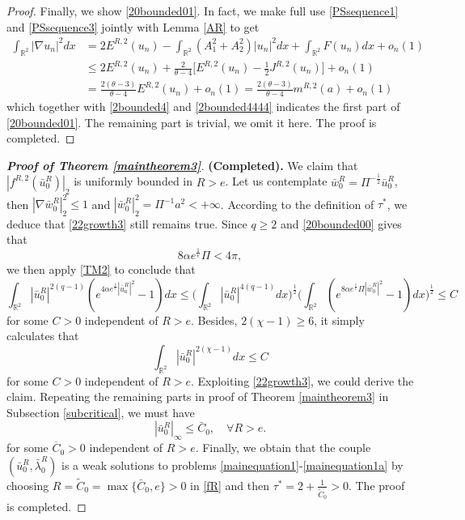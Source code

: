 \documentclass[11pt]{amsart}
\numberwithin{equation}{section}
\theoremstyle{definition}
\newcommand{\R}{\mathbb{R}}
\begin{document}
\begin{proof}
Finally, we show \eqref{20bounded01}. In fact, we make full use \eqref{PSsequence1} and \eqref{PSsequence3} jointly with Lemma \ref{AR}
to get
\begin{align*}
  \int_{\R^2}|\nabla u_n|^2dx &=2E^{R,2}(u_n)-\int_{\R^2}(A_1^2+A_2^2)|u_n|^2dx+\int_{\R^2}F(u_n)dx+o_n(1) \\
    &\leq  2E^{R,2}(u_n)+\frac{2}{\theta-4}\big[E^{R,2}(u_n)-\frac12J^{R,2}(u_n)\big]+o_n(1)\\
 &=  \frac{2(\theta-3)}{\theta-4} E^{R,2}(u_n) +o_n(1)
=  \frac{2(\theta-3)}{\theta-4}  m^{R,2}(a)+o_n(1)
\end{align*}
which together with \eqref{2bounded4} and \eqref{2bounded4444} indicates the first part of \eqref{20bounded01}.
The remaining part is trivial, we omit it here. The proof is completed.
\end{proof}



\begin{proof}[\textbf{\emph{Proof of Theorem \ref{maintheorem3}}}]\textbf{(Completed).}
We
 claim that $|f^{R,2}(\bar{u}_0^R)|_2$ is uniformly bounded in $R>e$.
Let us contemplate $\bar{w}_0^R=\Pi^{-\frac{1}{2}}\bar{u}_0^R$,
then $|\nabla\bar{w}_0^R|^2_{2}\leq 1$ and $|\bar{w}_0^R|^2_{2}=\Pi^{-1}a^2<+\infty$. According to the definition of $\tau^*$,
we deduce that \eqref{22growth3} still remains true.
 Since $q\geq2$ and \eqref{20bounded00} gives that
\[
 8\alpha e^{\frac1e} \Pi< 4\pi ,
\]
we then apply \eqref{TM2} to conclude that
\[
 \int_{\R^2} |\bar{u}_0^R|^{2(q-1)}(e^{4\alpha e^{\frac1e} |\bar{u}_a^R|^2}-1) dx
\leq \bigg(\int_{\R^2} |\bar{u}_0^R|^{4(q-1)} dx\bigg)^{\frac12}
\bigg(\int_{\R^2} (e^{8\alpha e^{\frac1e}\Pi |\bar{w}_0^R|^2}-1) dx\bigg)^{\frac12}\leq C
\]
for some $C>0$ independent of $R>e$. Besides, $2(\chi-1)\geq6$, it simply calculates that
\[
\int_{\R^2} |\bar{u}_0^R|^{2(\chi-1)} dx\leq C
\]
for some $C>0$ independent of $R>e$. Exploiting \eqref{22growth3}, we could derive the claim.
Repeating the remaining parts in proof of Theorem \ref{maintheorem3} in Subsection \ref{subcritical}, we must have
$$
|\bar{u}_0^R|_\infty \leq \bar{C}_0, \quad \forall R>e.
$$
for some $\overline{C}_0>0$ independent of $R>e$.
Finally, we obtain that the couple $(\bar{u}_0^R,\bar{\lambda}_0^R)$ is a weak solutions to problems \eqref{mainequation1}-\eqref{mainequation1a}
by choosing $R=\tilde{C}_0=\max\{\bar{C}_0,e\}>0$ in \eqref{fR} and then $\tau^*=2+\frac1{ \tilde{C}_0} >0$. The proof is completed.
\end{proof}
\end{document}
